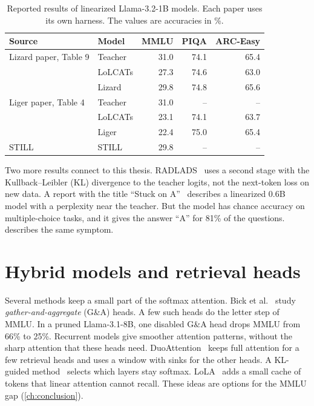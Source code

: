\begin{table}[ht]
\centering
\small
\caption[Reported results of linearized Llama-3.2-1B models]{Reported results of linearized Llama-3.2-1B models. Each paper uses its own harness. The values are accuracies in \%.}
\label{tab:rw-1b}
\begin{tabular}{@{}llrrr@{}}
\toprule
Source & Model & MMLU & PIQA & ARC-Easy \\
\midrule
Lizard paper, Table 9 & Teacher & 31.0 & 74.1 & 65.4 \\
 & LoLCATs & 27.3 & 74.6 & 63.0 \\
 & Lizard & 29.8 & 74.8 & 65.6 \\
Liger paper, Table 4 & Teacher & 31.0 & -- & -- \\
 & LoLCATs & 23.1 & 74.1 & 63.7 \\
 & Liger & 22.4 & 75.0 & 65.4 \\
STILL & STILL & 29.8 & -- & -- \\
\bottomrule
\end{tabular}
\end{table}

Two more results connect to this thesis. RADLADS~\cite{radlads} uses a second stage with the Kullback--Leibler (KL) divergence to the teacher logits, not the next-token loss on new data. A report with the title \enquote{Stuck on A}~\cite{stuckona} describes a linearized 0.6B model with a perplexity near the teacher. But the model has chance accuracy on multiple-choice tasks, and it gives the answer \enquote{A} for 81\% of the questions.  describes the same symptom.

\section{Hybrid models and retrieval heads}
\label{sec:rw-hybrid}

Several methods keep a small part of the softmax attention. Bick et al.~\cite{bick2025} study \emph{gather-and-aggregate} (G\&A) heads. A few such heads do the letter step of MMLU. In a pruned Llama-3.1-8B, one disabled G\&A head drops MMLU from 66\% to 25\%. Recurrent models give smoother attention patterns, without the sharp attention that these heads need. DuoAttention~\cite{duoattention} keeps full attention for a few retrieval heads and uses a window with sinks for the other heads. A KL-guided method~\cite{klselect} selects which layers stay softmax. LoLA~\cite{lola} adds a small cache of tokens that linear attention cannot recall. These ideas are options for the MMLU gap (\cref{ch:conclusion}).

